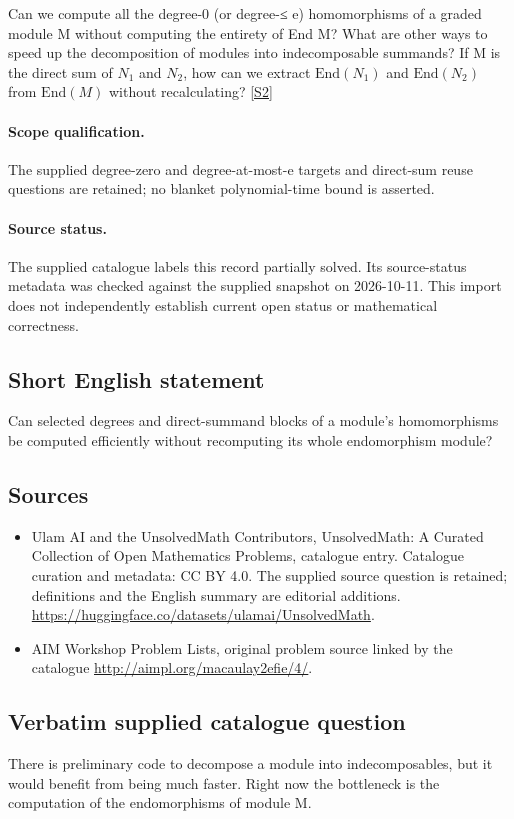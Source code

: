 \documentclass[11pt]{article}
\begin{document}
Can we compute all the degree-0 (or degree-≤ e) homomorphisms of a graded module M without computing the entirety of End M? What are other ways to speed up the decomposition of modules into indecomposable summands? If M is the direct sum of $N_1$ and $N_2$, how can we extract $\mathrm{End}(N_1)$ and $\mathrm{End}(N_2)$ from $\mathrm{End}(M)$ without recalculating? \href{http://aimpl.org/macaulay2efie/4/}{[S2]}
\paragraph{Scope qualification.}
The supplied degree-zero and degree-at-most-e targets and direct-sum reuse questions are retained; no blanket polynomial-time bound is asserted.
\paragraph{Source status.}
The supplied catalogue labels this record partially solved. Its source-status metadata was checked against the supplied snapshot on 2026-10-11. This import does not independently establish current open status or mathematical correctness.
\subsection{Short English statement}
Can selected degrees and direct-summand blocks of a module's homomorphisms be computed efficiently without recomputing its whole endomorphism module?
\subsection{Sources}
\begin{itemize}
\item[S1] Ulam AI and the UnsolvedMath Contributors, UnsolvedMath: A Curated Collection of Open Mathematics Problems, catalogue entry. Catalogue curation and metadata: CC BY 4.0. The supplied source question is retained; definitions and the English summary are editorial additions.
\url{https://huggingface.co/datasets/ulamai/UnsolvedMath}.
\item[S2] AIM Workshop Problem Lists, original problem source linked by the catalogue
\url{http://aimpl.org/macaulay2efie/4/}.
\end{itemize}
\subsection{Verbatim supplied catalogue question}
There is preliminary code to decompose a module into indecomposables, but it would benefit from being much faster. Right now the bottleneck is the computation of the endomorphisms of module M.
\end{document}
